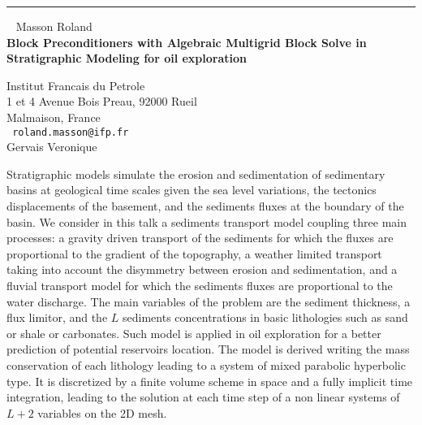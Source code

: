 \documentclass{report}
\begin{document}
\begin{center}

\rule{6in}{1pt} \
{\large
Masson Roland
\\ {\bf
Block Preconditioners with Algebraic Multigrid Block Solve in
Stratigraphic Modeling for oil exploration
}}

Institut Francais du Petrole \\
1 et 4 Avenue Bois Preau, 92000 Rueil \\
Malmaison, France
\\ {\tt
roland.masson@ifp.fr 
}
\\
Gervais Veronique
\end{center}

Stratigraphic models simulate the erosion and sedimentation of
sedimentary basins at geological time scales given the sea level
variations, the tectonics displacements of the basement, and the
sediments fluxes at the boundary of the basin. We consider in this talk
a sediments transport model coupling three main processes: a gravity
driven transport of the sediments for which the fluxes are proportional
to the gradient of the topography, a weather limited transport taking
into account the disymmetry between erosion and sedimentation, and a
fluvial transport model for which the sediments fluxes are proportional
to the water discharge. The main variables of the problem are the
sediment thickness, a flux limitor, and the $L$ sediments concentrations
in basic lithologies such as sand or shale or carbonates. Such model is
applied in oil exploration for a better prediction of potential
reservoirs location. The model is derived writing the mass conservation
of each lithology leading to a system of mixed parabolic hyperbolic
type. It is discretized by a finite volume scheme in space and a fully
implicit time integration, leading to the solution at each time step of
a non linear systems of $L+2$ variables on the 2D mesh.
\end{document}
